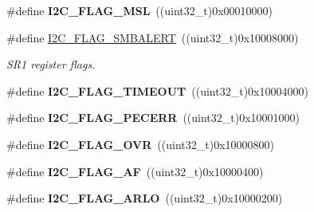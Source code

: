 \begin{DoxyCompactItemize}
\item 
\hypertarget{group___i2_c__flags__definition_gae8e6a404cbfd70420d278d520304f368}{\#define {\bfseries I2\-C\-\_\-\-F\-L\-A\-G\-\_\-\-M\-S\-L}~((uint32\-\_\-t)0x00010000)}\label{group___i2_c__flags__definition_gae8e6a404cbfd70420d278d520304f368}

\item 
\hypertarget{group___i2_c__flags__definition_ga4e1d7cd1574d03ba501c27483300c1be}{\#define \hyperlink{group___i2_c__flags__definition_ga4e1d7cd1574d03ba501c27483300c1be}{I2\-C\-\_\-\-F\-L\-A\-G\-\_\-\-S\-M\-B\-A\-L\-E\-R\-T}~((uint32\-\_\-t)0x10008000)}\label{group___i2_c__flags__definition_ga4e1d7cd1574d03ba501c27483300c1be}

\begin{DoxyCompactList}\small\item\em S\-R1 register flags. \end{DoxyCompactList}\item 
\hypertarget{group___i2_c__flags__definition_ga89c8d5d8ccc77a8619fafe9b39d1cc74}{\#define {\bfseries I2\-C\-\_\-\-F\-L\-A\-G\-\_\-\-T\-I\-M\-E\-O\-U\-T}~((uint32\-\_\-t)0x10004000)}\label{group___i2_c__flags__definition_ga89c8d5d8ccc77a8619fafe9b39d1cc74}

\item 
\hypertarget{group___i2_c__flags__definition_ga6c7addb6413f165f42bcc87506ea8467}{\#define {\bfseries I2\-C\-\_\-\-F\-L\-A\-G\-\_\-\-P\-E\-C\-E\-R\-R}~((uint32\-\_\-t)0x10001000)}\label{group___i2_c__flags__definition_ga6c7addb6413f165f42bcc87506ea8467}

\item 
\hypertarget{group___i2_c__flags__definition_gab579673c8ac920db199aa7f18e547fb3}{\#define {\bfseries I2\-C\-\_\-\-F\-L\-A\-G\-\_\-\-O\-V\-R}~((uint32\-\_\-t)0x10000800)}\label{group___i2_c__flags__definition_gab579673c8ac920db199aa7f18e547fb3}

\item 
\hypertarget{group___i2_c__flags__definition_ga2f89dbba9b964e6ade1480705e7a97d4}{\#define {\bfseries I2\-C\-\_\-\-F\-L\-A\-G\-\_\-\-A\-F}~((uint32\-\_\-t)0x10000400)}\label{group___i2_c__flags__definition_ga2f89dbba9b964e6ade1480705e7a97d4}

\item 
\hypertarget{group___i2_c__flags__definition_gae1e67936f4780e42b8bbe04ac9c20a7b}{\#define {\bfseries I2\-C\-\_\-\-F\-L\-A\-G\-\_\-\-A\-R\-L\-O}~((uint32\-\_\-t)0x10000200)}\label{group___i2_c__flags__definition_gae1e67936f4780e42b8bbe04ac9c20a7b}


\end{DoxyCompactItemize}
